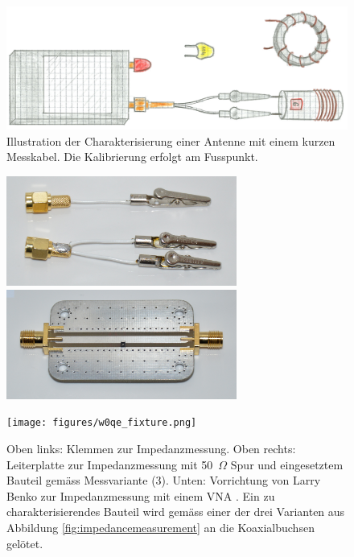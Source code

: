 \documentclass[twoside,a4paper,11pt,halfparskip,DIV=11,notitlepage]{scrartcl}
\newcommand{\Ohm}{$\Omega$\xspace}
\begin{document}
\begin{figure}[H]
    \includegraphics[width=\textwidth]{figures/illustration_impedance.png}
    \caption{Illustration der Charakterisierung einer Antenne mit einem kurzen Messkabel. Die Kalibrierung erfolgt am Fusspunkt.}
    \label{fig:illustrationimpedance}
\end{figure}

\begin{figure}\begin{center}
    \includegraphics[height=36mm]{figures/klemmen.jpg}\hfill
    \includegraphics[height=36mm]{figures/impedanzpcb.jpg}

    \texttt{[image: figures/w0qe\_fixture.png]}
    \caption{Oben links: Klemmen zur Impedanzmessung. Oben rechts: Leiterplatte zur Impedanzmessung
        mit 50~\Ohm Spur und eingesetztem Bauteil gemäss Messvariante (3). Unten: Vorrichtung von Larry Benko zur Impedanzmessung mit einem VNA \cite{benko2020impedance}.
    Ein zu charakterisierendes Bauteil wird gemäss einer der drei Varianten aus Abbildung \ref{fig:impedancemeasurement}
    an die Koaxialbuchsen gelötet.}
    \label{fig:testfixtures}
\end{center}\end{figure}

\newpage %
\end{document}
